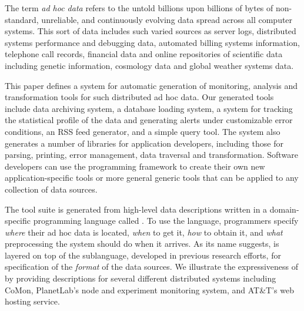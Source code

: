 The term {\em ad hoc data} refers to the untold billions upon billions of bytes
of non-standard, unreliable, and continuously evolving data spread
across all computer systems.  This sort of data includes such varied
sources as server logs, distributed systems performance and
debugging data, automated billing systems information, telephone call
records, financial data and online repositories of scientific data
including genetic information, cosmology data and global weather
systems data.

This paper defines a system for automatic generation of monitoring,
analysis and transformation tools for such distributed ad hoc data.
Our generated tools include data archiving system, a database loading
system, a system for tracking the statistical profile of the data and
generating alerts under customizable error conditions, an RSS feed
generator, and a simple query tool.  The system also generates a
number of libraries for application developers, including those for
parsing, printing, error management, data traversal and
transformation.  Software developers can use the programming framework
to create their own new application-specific tools or more general
generic tools that can be applied to any collection of data sources.

The tool suite is generated from high-level data descriptions
written in a domain-specific programming language called \padsd{}.  To
use the language, programmers specify {\em where} their ad hoc data is
located, {\em when} to get it, {\em how} to obtain it, and {\em what}
preprocessing the system should do when it arrives.  As its name suggests,
\padsd{} is layered on top of the \pads{} sublanguage, developed in
previous research efforts, for specification of the {\em format} of
the data sources.  We illustrate the expressiveness of \padsd{} by
providing descriptions for several different distributed systems
including CoMon, PlanetLab's node and experiment monitoring system,
and AT\&T's web hosting service.



